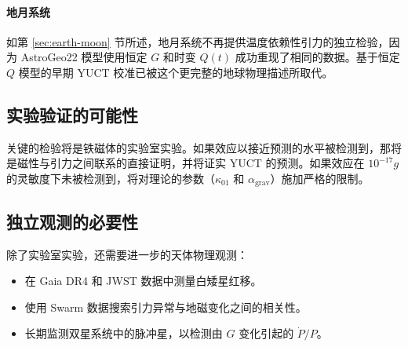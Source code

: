\documentclass[12pt]{article}
\theoremstyle{remark}
\begin{document}
	\paragraph{地月系统}
	如第 \ref{sec:earth-moon} 节所述，地月系统不再提供温度依赖性引力的独立检验，因为 AstroGeo22 模型使用恒定 $G$ 和时变 $Q(t)$ 成功重现了相同的数据。基于恒定 $Q$ 模型的早期 YUCT 校准已被这个更完整的地球物理描述所取代。
	
	\subsection{实验验证的可能性}
	\label{subsec:discussion-experiment}
	
	关键的检验将是铁磁体的实验室实验。如果效应以接近预测的水平被检测到，那将是磁性与引力之间联系的直接证明，并将证实 YUCT 的预测。如果效应在 $10^{-17}g$ 的灵敏度下未被检测到，将对理论的参数（$\kappa_{01}$ 和 $\alpha_{\text{grav}}$）施加严格的限制。
	
	\subsection{独立观测的必要性}
	\label{subsec:discussion-independent}
	
	除了实验室实验，还需要进一步的天体物理观测：
	\begin{itemize}
		\item 在 Gaia DR4 和 JWST 数据中测量白矮星红移。
		\item 使用 Swarm 数据搜索引力异常与地磁变化之间的相关性。
		\item 长期监测双星系统中的脉冲星，以检测由 $G$ 变化引起的 $\dot{P}/P$。
	\end{itemize}
	
\end{document}

